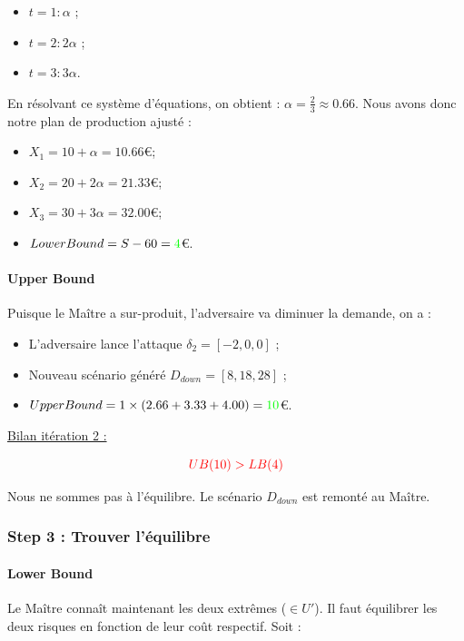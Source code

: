 \documentclass[11pt,a4paper]{article}
\begin{document}
\begin{itemize}
    \item $t=1 : \alpha$ ;
    \item $t=2 : 2\alpha$ ;
    \item $t=3 : 3\alpha$.
\end{itemize}

En résolvant ce système d'équations, on obtient : $\alpha=\frac{2}{3}\approx0.66$. Nous avons donc notre plan de production ajusté :

\begin{itemize}
    \item $X_1 = 10 + \alpha = 10.66$\euro ;
    \item $X_2 = 20 + 2\alpha = 21.33$\euro ;
    \item $X_3 = 30 + 3\alpha = 32.00$\euro ;
    \item $LowerBound=S-60=\textcolor{green}{4}$\euro.
\end{itemize}

\paragraph{Upper Bound} Puisque le Maître a sur-produit, l'adversaire va diminuer la demande, on a :

\begin{itemize}
    \item L'adversaire lance l'attaque $\delta_2=[-2, 0, 0]$ ;
    \item Nouveau scénario généré $D_{down}=[8, 18, 28]$ ;
    \item $UpperBound=1\times (2.66+3.33+4.00)=\textcolor{green}{10}$\euro.
\end{itemize}

\underline{Bilan itération 2 :}

\[
    \textcolor{red}{UB(10)>LB(4)}
\]

Nous ne sommes pas à l'équilibre. Le scénario $D_{down}$ est remonté au Maître.


\subsubsection{Step 3 : Trouver l'équilibre}

\paragraph{Lower Bound} Le Maître connaît maintenant les deux extrêmes ($\in U'$). Il faut équilibrer les deux risques en fonction de leur coût respectif. Soit :
\end{document}
